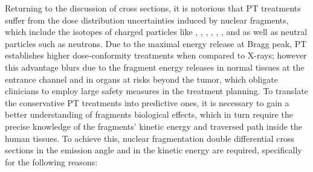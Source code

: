 Returning to the discussion of cross sections, it is notorious that PT treatments suffer from the dose distribution uncertainties induced by nuclear fragments, which include the isotopes of charged particles like , , , , , ,  and  as well as neutral particles such as neutrons. Due to the maximal energy release at Bragg peak, PT establishes higher dose-conformity treatments when compared to X-rays; however this advantage blurs due to the fragment energy releases in normal tissues at the entrance channel and in organs at risks beyond the tumor, which obligate clinicians to employ large safety measures in the treatment planning. To translate the conservative PT treatments into predictive ones, it is necessary to gain a better understanding of fragments biological effects, which in turn require the precise knowledge of the fragments' kinetic energy and traversed path inside the human tissues. To achieve this, nuclear fragmentation double differential cross sections in the emission angle and in the kinetic energy are required, specifically for the following reasons: 
